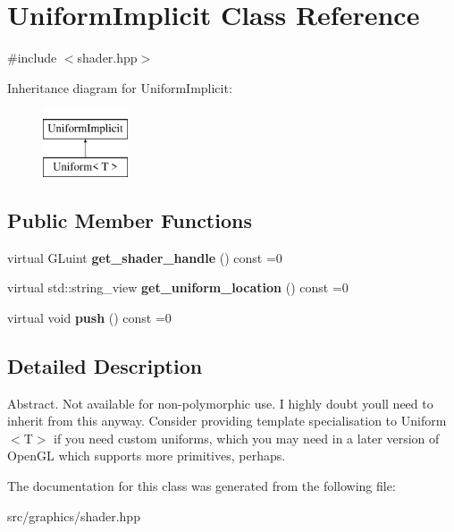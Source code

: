 \hypertarget{class_uniform_implicit}{}\section{Uniform\+Implicit Class Reference}
\label{class_uniform_implicit}


{\ttfamily \#include $<$shader.\+hpp$>$}

Inheritance diagram for Uniform\+Implicit\+:\begin{figure}[H]
\begin{center}
\leavevmode
\includegraphics[height=2.000000cm]{class_uniform_implicit}
\end{center}
\end{figure}
\subsection*{Public Member Functions}
\begin{DoxyCompactItemize}
\item 
\mbox{\label{class_uniform_implicit_aee430c236fdcb8fffb52e42f8d693e94}} 
virtual G\+Luint {\bfseries get\+\_\+shader\+\_\+handle} () const =0
\item 
\mbox{\label{class_uniform_implicit_afe64ca7076103269633a6e0ffbf1a63d}} 
virtual std\+::string\+\_\+view {\bfseries get\+\_\+uniform\+\_\+location} () const =0
\item 
\mbox{\label{class_uniform_implicit_ab417a55fb98b7b919f89dc549561475e}} 
virtual void {\bfseries push} () const =0
\end{DoxyCompactItemize}


\subsection{Detailed Description}
Abstract. Not available for non-\/polymorphic use. I highly doubt you\textquotesingle{}ll need to inherit from this anyway. Consider providing template specialisation to Uniform$<$\+T$>$ if you need custom uniforms, which you may need in a later version of Open\+GL which supports more primitives, perhaps. 

The documentation for this class was generated from the following file\+:\begin{DoxyCompactItemize}
\item 
src/graphics/shader.\+hpp\end{DoxyCompactItemize}
